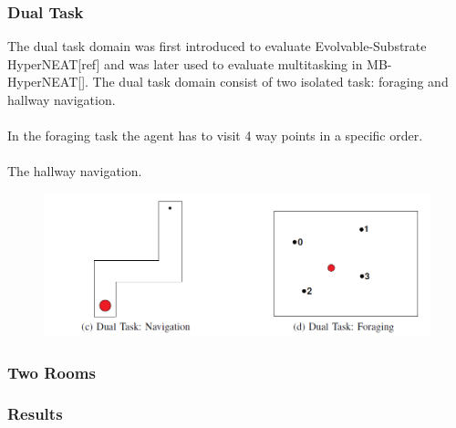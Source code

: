 \documentclass[11pt, a4paper]{article}
\begin{document}
\subsubsection{Dual Task}
The dual task domain was first introduced to evaluate Evolvable-Substrate HyperNEAT[ref] and was later used to evaluate multitasking in MB-HyperNEAT[]. The dual task domain consist of two isolated task: foraging and hallway navigation.
\\
\\
In the foraging task the agent has to visit 4 way points in a specific order.
\\
\\
The hallway navigation.
\begin{figure}[!ht]
\centering
\includegraphics[scale=0.4]{DualTaskDomain}
\caption{}
\end{figure}
\subsubsection{Two Rooms}
\subsubsection{Results}
\end{document}
